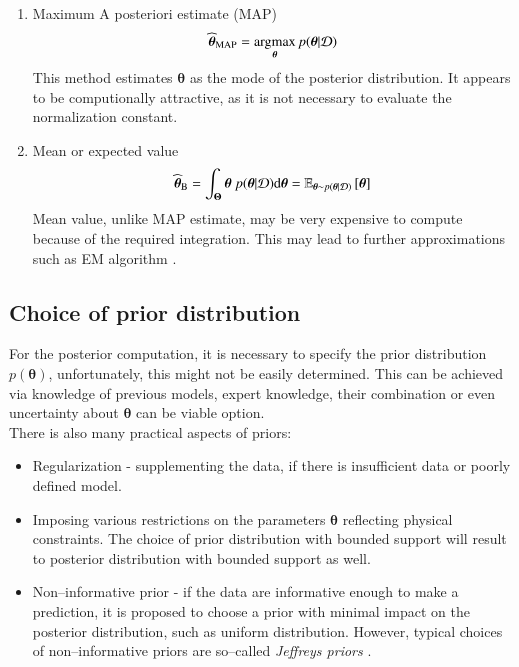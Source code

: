 \begin{enumerate}
	\item Maximum A posteriori estimate (MAP)
	\begin{equation}
		\widehat{\boldsymbol{\theta}}_{\mathrm{MAP}} = \mathop{\mathrm{argmax}}_{\boldsymbol{\theta}} p(\boldsymbol{\theta} | \mathcal{D})
	\end{equation}
This method estimates $\boldsymbol{\theta}$ as the mode of the posterior distribution. It appears to be computionally attractive, as it is not necessary to evaluate the normalization constant. 
\item Mean or expected value
\begin{equation}
	\widehat{\boldsymbol{\theta}}_{\mathrm{B}} = \int_{\boldsymbol{\Theta}} \boldsymbol{\theta}~ p(\boldsymbol{\theta} | \mathcal{D}) \mathrm{d}\boldsymbol{\theta} = \mathbb{E}_{\boldsymbol{\theta} \sim p(\boldsymbol{\theta} | \mathcal{D}) }\left[\boldsymbol{\theta} \right]
\end{equation}
Mean value, unlike MAP estimate, may be very expensive to compute because of the required integration. This may lead to further approximations such as EM algorithm \cite{EM}.
\end{enumerate}	

\subsection{Choice of prior distribution}
For the posterior computation, it is necessary to specify the prior distribution $p(\boldsymbol{\theta})$, unfortunately, this might not be easily determined. This can be achieved via knowledge of previous models, expert knowledge, their combination or even uncertainty about $\boldsymbol{\theta}$ can be viable option. \\
There is also many practical aspects of priors:
\begin{itemize}
	\item Regularization - supplementing the data, if there is insufficient data or poorly defined model. 
	\item Imposing various restrictions on the parameters $\boldsymbol{\theta}$ reflecting physical constraints. The choice of prior distribution with bounded support will result to posterior distribution with bounded support as well. 
	\item Non--informative prior - if the data are informative enough to make a prediction, it is proposed to choose a prior with minimal impact on the posterior distribution, such as uniform distribution. However, typical choices of non--informative priors are so--called \emph{Jeffreys priors} \cite{jeffrey}.
\end{itemize}



